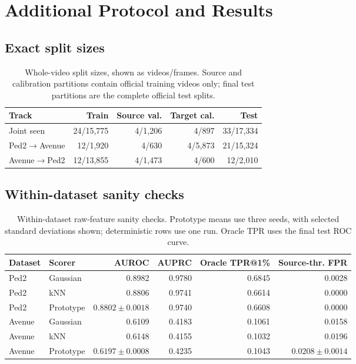 \section{Additional Protocol and Results}

\subsection{Exact split sizes}

\begin{table}[h]
\centering
\caption{Whole-video split sizes, shown as videos/frames. Source and calibration partitions contain official training videos only; final test partitions are the complete official test splits.}
\label{tab:splits}
\small
\begin{tabular}{lrrrr}
\toprule
Track & Train & Source val. & Target cal. & Test \\
\midrule
Joint seen & 24/15,775 & 4/1,206 & 4/897 & 33/17,334 \\
Ped2$\to$Avenue & 12/1,920 & 4/630 & 4/5,873 & 21/15,324 \\
Avenue$\to$Ped2 & 12/13,855 & 4/1,473 & 4/600 & 12/2,010 \\
\bottomrule
\end{tabular}
\end{table}

\subsection{Within-dataset sanity checks}

\begin{table}[h]
\centering
\caption{Within-dataset raw-feature sanity checks. Prototype means use three seeds, with selected standard deviations shown; deterministic rows use one run. Oracle TPR uses the final test ROC curve.}
\label{tab:within}
\small
\begin{tabular}{llrrrr}
\toprule
Dataset & Scorer & AUROC & AUPRC & Oracle TPR@1\% & Source-thr. FPR \\
\midrule
Ped2 & Gaussian & 0.8982 & 0.9780 & 0.6845 & 0.0028 \\
Ped2 & kNN & 0.8806 & 0.9741 & 0.6614 & 0.0000 \\
Ped2 & Prototype & $0.8802\pm0.0018$ & 0.9740 & 0.6608 & 0.0000 \\
Avenue & Gaussian & 0.6109 & 0.4183 & 0.1061 & 0.0158 \\
Avenue & kNN & 0.6148 & 0.4155 & 0.1032 & 0.0196 \\
Avenue & Prototype & $0.6197\pm0.0008$ & 0.4235 & 0.1043 & $0.0208\pm0.0014$ \\
\bottomrule
\end{tabular}
\end{table}

